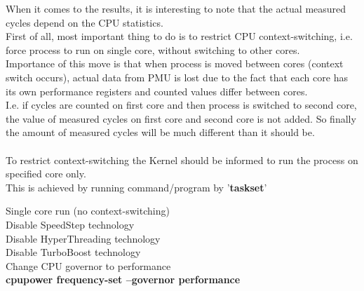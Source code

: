\documentclass[11pt,onecolumn]{article}
\begin{document}
When it comes to the results, it is interesting to note that the actual measured cycles depend on the CPU statistics.\\
First of all, most important thing to do is to restrict CPU context-switching, i.e. force process to run on single core, without switching to other cores.\\
Importance of this move is that when process is moved between cores (context switch occurs), actual data from PMU is lost due to the fact that each core has its own performance registers and counted values differ between cores.\\
I.e. if cycles are counted on first core  and then process is switched to second core, the value of measured cycles on first core and second core is not added. So finally the amount of measured cycles will be much different than it should be.\\\\
To restrict context-switching the Kernel should be informed to run the process on specified core only.\\
This is achieved by running command/program by '\textbf{taskset}'

Single core run (no context-switching)\\
Disable SpeedStep technology\\
Disable HyperThreading technology\\
Disable TurboBoost technology\\
Change CPU governor to performance\\
\textbf{cpupower frequency-set --governor performance}
\end{document}
